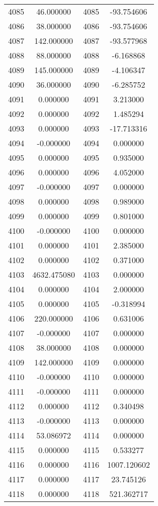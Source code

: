 \documentclass[12pt]{article}
\begin{document}
\begin{longtable}{@{}cccc@{}}
4085 & 46.000000 & 4085 & -93.754606 \\
4086 & 38.000000 & 4086 & -93.754606 \\
4087 & 142.000000 & 4087 & -93.577968 \\
4088 & 88.000000 & 4088 & -6.168868 \\
4089 & 145.000000 & 4089 & -4.106347 \\
4090 & 36.000000 & 4090 & -6.285752 \\
4091 & 0.000000 & 4091 & 3.213000 \\
4092 & 0.000000 & 4092 & 1.485294 \\
4093 & 0.000000 & 4093 & -17.713316 \\
4094 & -0.000000 & 4094 & 0.000000 \\
4095 & 0.000000 & 4095 & 0.935000 \\
4096 & 0.000000 & 4096 & 4.052000 \\
4097 & -0.000000 & 4097 & 0.000000 \\
4098 & 0.000000 & 4098 & 0.989000 \\
4099 & 0.000000 & 4099 & 0.801000 \\
4100 & -0.000000 & 4100 & 0.000000 \\
4101 & 0.000000 & 4101 & 2.385000 \\
4102 & 0.000000 & 4102 & 0.371000 \\
4103 & 4632.475080 & 4103 & 0.000000 \\
4104 & 0.000000 & 4104 & 2.000000 \\
4105 & 0.000000 & 4105 & -0.318994 \\
4106 & 220.000000 & 4106 & 0.631006 \\
4107 & -0.000000 & 4107 & 0.000000 \\
4108 & 38.000000 & 4108 & 0.000000 \\
4109 & 142.000000 & 4109 & 0.000000 \\
4110 & -0.000000 & 4110 & 0.000000 \\
4111 & -0.000000 & 4111 & 0.000000 \\
4112 & 0.000000 & 4112 & 0.340498 \\
4113 & -0.000000 & 4113 & 0.000000 \\
4114 & 53.086972 & 4114 & 0.000000 \\
4115 & 0.000000 & 4115 & 0.533277 \\
4116 & 0.000000 & 4116 & 1007.120602 \\
4117 & 0.000000 & 4117 & 23.745126 \\
4118 & 0.000000 & 4118 & 521.362717 \\

\end{longtable}
\end{document}
